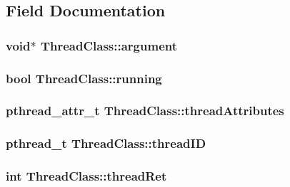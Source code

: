 \subsection{\-Field \-Documentation}
\hypertarget{classThreadClass_a7effd31058a832eeb54cf66c3aeafc76}{
\subsubsection[{argument}]{\setlength{\rightskip}{0pt plus 5cm}void$\ast$ {\bf \-Thread\-Class\-::argument}}}\label{classThreadClass_a7effd31058a832eeb54cf66c3aeafc76}
\hypertarget{classThreadClass_a2aa53aff814975c40dc812eaaa2d0d81}{
\subsubsection[{running}]{\setlength{\rightskip}{0pt plus 5cm}bool {\bf \-Thread\-Class\-::running}}}\label{classThreadClass_a2aa53aff814975c40dc812eaaa2d0d81}
\hypertarget{classThreadClass_a95d790595bd67ed1a5214a8695e98951}{
\subsubsection[{thread\-Attributes}]{\setlength{\rightskip}{0pt plus 5cm}pthread\-\_\-attr\-\_\-t {\bf \-Thread\-Class\-::thread\-Attributes}}}\label{classThreadClass_a95d790595bd67ed1a5214a8695e98951}
\hypertarget{classThreadClass_a6f5521336f26af81e448253c24ee086f}{
\subsubsection[{thread\-I\-D}]{\setlength{\rightskip}{0pt plus 5cm}pthread\-\_\-t {\bf \-Thread\-Class\-::thread\-I\-D}}}\label{classThreadClass_a6f5521336f26af81e448253c24ee086f}
\hypertarget{classThreadClass_a7b48f9078caebbc5846585e2ef1eb10c}{
\subsubsection[{thread\-Ret}]{\setlength{\rightskip}{0pt plus 5cm}int {\bf \-Thread\-Class\-::thread\-Ret}}}\label{classThreadClass_a7b48f9078caebbc5846585e2ef1eb10c}


